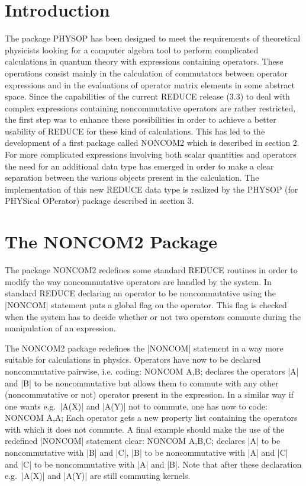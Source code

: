\section{Introduction}
The package PHYSOP has been designed to meet the requirements of
theoretical physicists looking for a
computer algebra tool to perform complicated calculations
in quantum theory
with expressions containing operators. These operations
consist mainly in the calculation of commutators between operator
expressions and in the evaluations of operator matrix elements
in some abstract space. Since the capabilities
of the current REDUCE release (3.3) to deal with complex
expressions containing noncommutative operators are rather restricted,
the first step was to enhance these possibilities in order to
achieve a better  usability of REDUCE for these kind of calculations.
This has led to the development of a first package called
NONCOM2 which is described in section 2. For more complicated
expressions involving both scalar quantities and operators
the need for an additional data type has emerged in order to make a
clear separation between the various objects present in the calculation.
The implementation of this  new REDUCE data type is realized by the
PHYSOP (for PHYSical OPerator) package described in section 3.

\section{The NONCOM2 Package}

The package NONCOM2  redefines some standard REDUCE routines
in order to modify the way noncommutative operators are handled by the
system. In standard REDUCE declaring an operator to be noncommutative
using the |NONCOM| statement puts a global flag on the
operator. This flag is checked when the system has to decide
whether or not two operators commute during the manipulation of an
expression.

The NONCOM2 package redefines the |NONCOM|  statement in
a way more suitable for calculations in physics. Operators have now to
be declared noncommutative pairwise, i.e. coding:
\begintt
NONCOM A,B;
\endtt
declares the operators |A| and |B| to be noncommutative but allows them
to commute with any other (noncommutative or not) operator present in
the expression. In a similar way if one wants e.g.\ |A(X)| and
 |A(Y)| not to commute, one has now to code:
\begintt
 NONCOM A,A;
\endtt
Each operator gets a new property list containing the
operators with which it does not commute.
A final example should make
the use of the redefined |NONCOM| statement clear:
\begintt
NONCOM A,B,C;
\endtt
declares |A|  to be noncommutative with |B| and |C|,
|B| to be noncommutative
with |A| and |C| and |C| to be noncommutative
with |A| and |B|.
Note that after these declaration
e.g.\ |A(X)| and |A(Y)|
are still commuting kernels.

